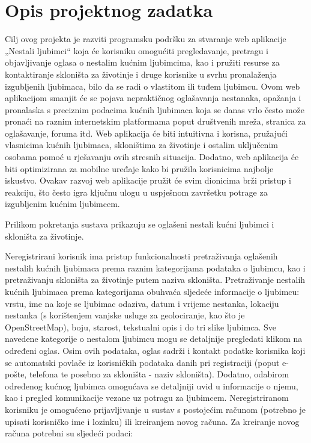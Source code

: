 \chapter{Opis projektnog zadatka}
		
		Cilj ovog projekta je razviti programsku podršku za stvaranje web aplikacije „Nestali ljubimci“ koja će korisniku omogućiti pregledavanje, pretragu i objavljivanje oglasa o nestalim kućnim ljubimcima, kao i pružiti resurse za kontaktiranje skloništa za životinje i druge korisnike u svrhu pronalaženja izgubljenih ljubimaca, bilo da se radi o vlastitom ili tuđem ljubimcu. Ovom web aplikacijom smanjit će se pojava nepraktičnog oglašavanja nestanaka, opažanja i pronalaska s preciznim podacima kućnih ljubimaca koja se danas vrlo često može pronaći na raznim internetskim platformama poput društvenih mreža, stranica za oglašavanje, foruma itd. Web aplikacija će biti intuitivna i korisna, pružajući vlasnicima kućnih ljubimaca, skloništima za životinje i ostalim uključenim osobama pomoć u rješavanju ovih stresnih situacija. Dodatno, web aplikacija će biti optimizirana za mobilne uređaje kako bi pružila korisnicima najbolje iskustvo. Ovakav razvoj web aplikacije pružit će svim dionicima brži pristup i reakciju, što često igra ključnu ulogu u uspješnom završetku potrage za izgubljenim kućnim ljubimcem.
		
		Prilikom pokretanja sustava prikazuju se oglašeni nestali kućni ljubimci i skloništa za životinje.
		
		Neregistrirani korisnik ima pristup funkcionalnosti pretraživanja oglašenih nestalih kućnih ljubimaca prema raznim kategorijama podataka o ljubimcu, kao i pretraživanju skloništa za životinje putem naziva skloništa. Pretraživanje nestalih kućnih ljubimaca prema kategorijama obuhvaća sljedeće informacije o ljubimcu: vrstu, ime na koje se ljubimac odaziva, datum i vrijeme nestanka, lokaciju nestanka (s korištenjem vanjske usluge za geolociranje, kao što je OpenStreetMap), boju, starost, tekstualni opis i do tri slike ljubimca. Sve navedene kategorije o nestalom ljubimcu mogu se detaljnije pregledati klikom na određeni oglas. Osim ovih podataka, oglas sadrži i kontakt podatke korisnika koji se automatski povlače iz korisničkih podataka danih pri registraciji (poput e-pošte, telefona te posebno za skloništa - naziv skloništa). Dodatno, odabirom određenog kućnog ljubimca omogućava se detaljniji uvid u informacije o njemu, kao i pregled komunikacije vezane uz potragu za ljubimcem. Neregistriranom korisniku je omogućeno prijavljivanje u sustav s postojećim računom (potrebno je upisati korisničko ime i lozinku) ili kreiranjem novog računa. Za kreiranje novog računa potrebni su sljedeći podaci:
		
